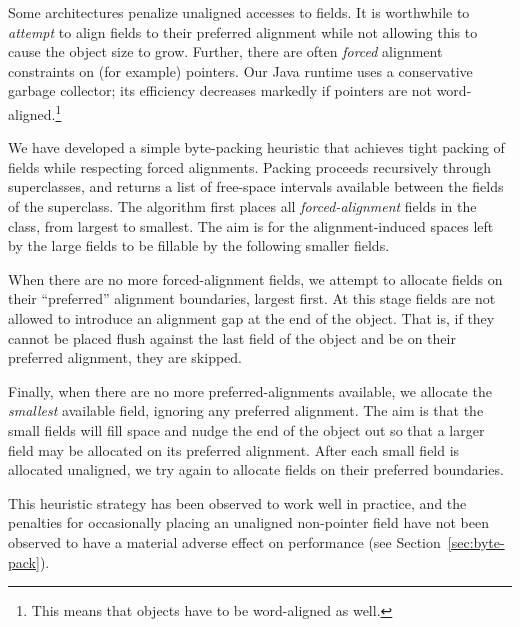 \documentclass[oribibl]{llncs}
\begin{document}
Some architectures penalize unaligned accesses to fields.  It is
worthwhile to {\it attempt} to align fields to their preferred
alignment while not allowing this to cause the object size to grow.
Further, there are often {\it forced} alignment constraints on
(for example) pointers.  Our Java runtime uses a conservative garbage
collector; its efficiency decreases markedly if pointers are not
word-aligned.\footnote{This means that objects have to be word-aligned
  as well.}

We have developed a simple byte-packing heuristic that achieves
tight packing of fields while respecting forced alignments.  Packing
proceeds recursively through superclasses, and returns a list of
free-space intervals available between the fields of the superclass.
The algorithm first places all {\it forced-alignment} fields in
the class, from largest to smallest.  The aim is for the
alignment-induced spaces left by the large fields to be fillable by
the following smaller fields.

When there are no more forced-alignment fields, we attempt to allocate
fields on their ``preferred'' alignment boundaries, largest first.
At this stage fields are not allowed to introduce an alignment gap at
the end of the object.  That is, if they cannot be placed flush
against the last field of the object and be on their preferred
alignment, they are skipped.

Finally, when there are no more preferred-alignments available, we
allocate the {\it smallest} available field, ignoring any preferred
alignment.  The aim is that the small fields will fill space and nudge
the end of the object out so that a larger field may be allocated on
its preferred alignment.  After each small field is allocated
unaligned, we try again to allocate fields on their preferred
boundaries.

This heuristic strategy has been observed to work well in practice,
and the penalties for occasionally placing an unaligned non-pointer
field have not
been observed to have a material adverse effect on performance (see
Section~\ref{sec:byte-pack}). 

\end{document}
